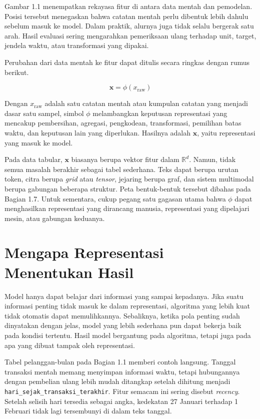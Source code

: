 Gambar 1.1 menempatkan rekayasa fitur di antara data mentah dan pemodelan. Posisi tersebut menegaskan bahwa catatan mentah perlu dibentuk lebih dahulu sebelum masuk ke model. Dalam praktik, alurnya juga tidak selalu bergerak satu arah. Hasil evaluasi sering mengarahkan pemeriksaan ulang terhadap unit, target, jendela waktu, atau transformasi yang dipakai.

Perubahan dari data mentah ke fitur dapat ditulis secara ringkas dengan rumus berikut.

\[
\mathbf{x} = \phi(x_{\text{raw}})
\]

Dengan \(x_{\text{raw}}\) adalah satu catatan mentah atau kumpulan catatan yang menjadi dasar satu sampel, simbol \(\phi\) melambangkan keputusan representasi yang mencakup pembersihan, agregasi, pengkodean, transformasi, pemilihan batas waktu, dan keputusan lain yang diperlukan. Hasilnya adalah \(\mathbf{x}\), yaitu representasi yang masuk ke model.

Pada data tabular, \(\mathbf{x}\) biasanya berupa vektor fitur dalam \(\mathbb{R}^d\). Namun, tidak semua masalah berakhir sebagai tabel sederhana. Teks dapat berupa urutan token, citra berupa \emph{grid} atau \emph{tensor}, jejaring berupa graf, dan sistem multimodal berupa gabungan beberapa struktur. Peta bentuk-bentuk tersebut dibahas pada Bagian 1.7. Untuk sementara, cukup pegang satu gagasan utama bahwa \(\phi\) dapat menghasilkan representasi yang dirancang manusia, representasi yang dipelajari mesin, atau gabungan keduanya.

\section{Mengapa Representasi Menentukan Hasil}\label{mengapa-representasi-menentukan-hasil}

Model hanya dapat belajar dari informasi yang sampai kepadanya. Jika suatu informasi penting tidak masuk ke dalam representasi, algoritma yang lebih kuat tidak otomatis dapat memulihkannya. Sebaliknya, ketika pola penting sudah dinyatakan dengan jelas, model yang lebih sederhana pun dapat bekerja baik pada kondisi tertentu. Hasil model bergantung pada algoritma, tetapi juga pada apa yang dibuat tampak oleh representasi.

Tabel pelanggan-bulan pada Bagian 1.1 memberi contoh langsung. Tanggal transaksi mentah memang menyimpan informasi waktu, tetapi hubungannya dengan pembelian ulang lebih mudah ditangkap setelah dihitung menjadi \passthrough{\lstinline!hari_sejak_transaksi_terakhir!}. Fitur semacam ini sering disebut \emph{recency}. Setelah selisih hari tersedia sebagai angka, kedekatan 27 Januari terhadap 1 Februari tidak lagi tersembunyi di dalam teks tanggal.

